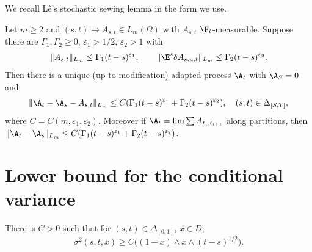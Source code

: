 We recall L\^e's stochastic sewing lemma in the form we use.

\begin{lemma}\label{lem:SSL}
Let $m\ge2$ and $(s,t)\mapsto A_{s,t}\in L_m(\Omega)$ with $A_{s,t}$ $\F_t$-measurable. Suppose there are $\Gamma_1,\Gamma_2\ge0$, $\varepsilon_1>1/2$, $\varepsilon_2>1$ with
\[
\|A_{s,t}\|_{L_m}\le \Gamma_1(t-s)^{\varepsilon_1},\qquad
\|\E^s\delta A_{s,u,t}\|_{L_m}\le \Gamma_2(t-s)^{\varepsilon_2}.
\]
Then there is a unique (up to modification) adapted process $\A_t$ with $\A_S=0$ and
\[
\|\A_t-\A_s-A_{s,t}\|_{L_m}\le C(\Gamma_1(t-s)^{\varepsilon_1}+\Gamma_2(t-s)^{\varepsilon_2}),\quad (s,t)\in\Delta_{[S,T]},
\]
where $C=C(m,\varepsilon_1,\varepsilon_2)$. Moreover if $\A_t=\lim \sum A_{t_i,t_{i+1}}$ along partitions, then $\|\A_t-\A_s\|_{L_m}\le C(\Gamma_1(t-s)^{\varepsilon_1}+\Gamma_2(t-s)^{\varepsilon_2})$.
\end{lemma}

\section{Lower bound for the conditional variance}

\begin{lemma}\label{L:fkb}
There is $C>0$ such that for $(s,t)\in\Delta_{[0,1]}$, $x\in D$,
\[
\sigma^2(s,t,x)\ge C\big((1-x)\wedge x\wedge (t-s)^{1/2}\big).
\]
\end{lemma}

